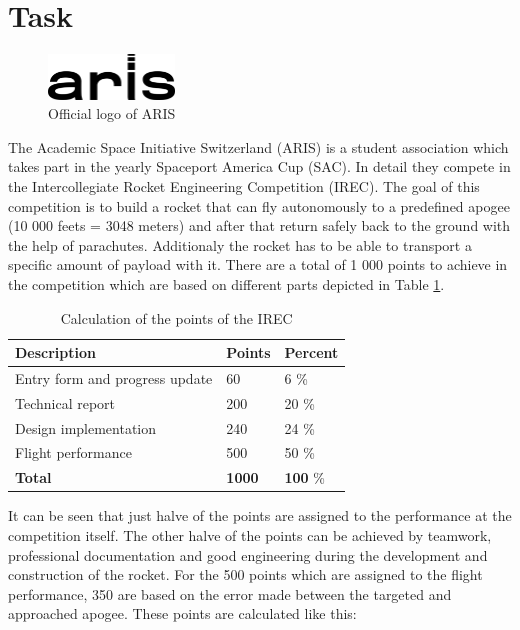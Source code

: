 
 \section{Task}

 \begin{figure}[h!]
 \centering
 \includegraphics[width=0.3\textwidth]{./Pictures/ARIS_logo.png}
 \caption{Official logo of ARIS \cite{ARIS}}
 \label{fig:ArisLogo}
\end{figure}

 The Academic Space Initiative Switzerland (ARIS) is a student association which takes part in the yearly Spaceport America Cup (SAC).
 In detail they compete in the Intercollegiate Rocket Engineering Competition (IREC).
 The goal of this competition is to build a rocket that can fly autonomously to a predefined apogee (10 000 feets = 3048 meters) and after that return safely back to the ground with the help of parachutes.
 Additionaly the rocket has to be able to transport a specific amount of payload with it.
 There are a total of 1 000 points to achieve in the competition which are based on different parts depicted in Table \ref{tab:CompetitionCalculation}.

\begin{table}[h]
\centering
\begin{tabular}{|l|l|l|}\hline
{\bf Description} & {\bf Points} & {\bf Percent}\\\hline
Entry form and progress update & 60 & 6 \% \\ \hline
Technical report & 200 & 20 \% \\ \hline
Design implementation & 240 & 24 \% \\ \hline
Flight performance & 500 & 50 \% \\ \hline
{\bf Total} & {\bf 1000} & {\bf 100} \% \\ \hline
\end{tabular}
\caption{Calculation of the points of the IREC}
\label{tab:CompetitionCalculation}
\end{table}


 It can be seen that just halve of the points are assigned to the performance at the competition itself.
 The other halve of the points can be achieved by teamwork, professional documentation and good engineering during the development and construction of the rocket.
 For the 500 points which are assigned to the flight performance, 350 are based on the error made between the targeted and approached apogee.
 These points are calculated like this:

